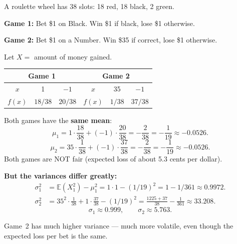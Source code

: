 \documentclass{article}
\theoremstyle{remark}
\newlength{\subsecindent}
\newenvironment{secbody}{%
  \begin{list}{}{%
    \setlength{\leftmargin}{\subsecindent}%
    \setlength{\rightmargin}{0pt}%
    \setlength{\topsep}{0pt}%
    \setlength{\partopsep}{0pt}%
    \setlength{\parsep}{\parskip}%
    \setlength{\itemsep}{\parskip}%
  }\item\relax
}{\end{list}}
\newcommand{\E}{\mathbb{E}}
\begin{document}
\begin{secbody}

A roulette wheel has 38 slots: 18 red, 18 black, 2 green.

\textbf{Game 1:} Bet \$1 on Black. Win \$1 if black, lose \$1 otherwise.

\textbf{Game 2:} Bet \$1 on a Number. Win \$35 if correct, lose \$1 otherwise.

Let $X =$ amount of money gained.

\begin{center}
\begin{tabular}{c|cc|c|cc}
\multicolumn{3}{c|}{\textbf{Game 1}} & \multicolumn{3}{c}{\textbf{Game 2}} \\
\hline
$x$ & 1 & $-1$ & $x$ & 35 & $-1$ \\
$f(x)$ & $18/38$ & $20/38$ & $f(x)$ & $1/38$ & $37/38$
\end{tabular}
\end{center}

Both games have the \textbf{same mean}:
\[
  \mu_1 = 1 \cdot \frac{18}{38} + (-1) \cdot \frac{20}{38} = -\frac{2}{38} = -\frac{1}{19} \approx -0.0526.
\]
\[
  \mu_2 = 35 \cdot \frac{1}{38} + (-1) \cdot \frac{37}{38} = -\frac{2}{38} = -\frac{1}{19} \approx -0.0526.
\]
Both games are NOT fair (expected loss of about 5.3 cents per dollar).

\textbf{But the variances differ greatly:}
\begin{align*}
  \sigma_1^2 &= \E(X_1^2) - \mu_1^2 = 1 \cdot 1 - (1/19)^2 = 1 - 1/361 \approx 0.9972. \\
  \sigma_2^2 &= 35^2 \cdot \frac{1}{38} + 1 \cdot \frac{37}{38} - (1/19)^2
             = \frac{1225 + 37}{38} - \frac{1}{361} \approx 33.208.
\end{align*}
\[
  \sigma_1 \approx 0.999, \qquad \sigma_2 \approx 5.763.
\]

Game~2 has much higher variance --- much more volatile, even though the
expected loss per bet is the same.

\end{secbody}
\end{document}
